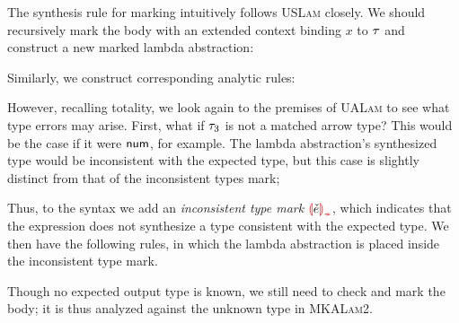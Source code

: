 The synthesis rule for marking intuitively follows \textsc{USLam} closely. We should recursively
mark the body with an extended context binding $x$ to $\TMV$ and construct a new marked lambda
abstraction:
%
\begin{mathpar}

\end{mathpar}
%
Similarly, we construct corresponding analytic rules:
%
\begin{mathpar}

\end{mathpar}
%
However, recalling totality, we look again to the premises of \textsc{UALam} to see what type errors
may arise. First, what if $\TMV_3$ is not a matched arrow type? This would be the case if it were
$\TNum$, for example. The lambda abstraction's synthesized type would be inconsistent with the
expected type, but this case is slightly distinct from that of the inconsistent types mark;

Thus,
to the syntax we add an \emph{inconsistent type mark} $\ECInconType{\ECMV}$, which indicates that
the expression does not synthesize a type consistent with the expected type. We then have the
following rules, in which the lambda abstraction is placed inside the inconsistent type mark.
%
\begin{mathpar}

\end{mathpar}
%
Though no expected output type is known, we still need to check and mark the body; it is thus
analyzed against the unknown type in \textsc{MKALam2}.

